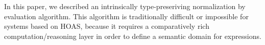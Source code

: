 \documentclass{article}
\begin{document}
In this paper, we described an intrinsically type-preseriving
normalization by evaluation algorithm. This algorithm is traditionally
difficult or impossible for systems based on HOAS, because it requires
a comparatively rich computation/reasoning layer in order to define a semantic domain for expressions.

\end{document}
